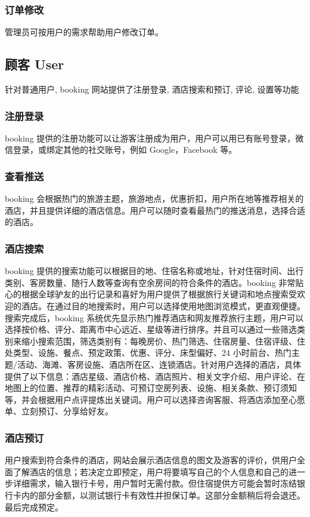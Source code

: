 \documentclass[11pt]{article}
\begin{document}
		\subsubsection{订单修改} 
		管理员可按用户的需求帮助用户修改订单。
		
	\subsection{顾客 User}
		针对普通用户, booking 网站提供了注册登录, 酒店搜索和预订, 评论, 设置等功能
		\subsubsection{注册登录}
		booking 提供的注册功能可以让游客注册成为用户，用户可以用已有账号登录，微信登录，或绑定其他的社交账号，例如 Google，Facebook 等。
		\subsubsection{查看推送}
		booking 会根据热门的旅游主题，旅游地点，优惠折扣，用户所在地等推荐相关的酒店，并且提供详细的酒店信息。用户可以随时查看最热门的推送消息，选择合适的酒店。
		\subsubsection{酒店搜索}
		booking 提供的搜索功能可以根据目的地、住宿名称或地址，针对住宿时间、出行类别、客房数量、随行人数等查询有空余房间的符合条件的酒店。booking 非常贴心的根据全球驴友的出行记录和喜好为用户提供了根据旅行关键词和地点搜索受欢迎的酒店。在通过目的地搜索时，用户可以选择使用地图浏览模式，更直观便捷。搜索完成后，booking 系统优先显示热门推荐酒店和网友推荐旅行主题，用户可以选择按价格、评分、距离市中心远近、星级等进行排序。并且可以通过一些筛选类别来缩小搜索范围，筛选类别有：每晚房价、热门筛选、住宿房量、住宿评级、住处类型、设施、餐点、预定政策、优惠、评分、床型偏好、24 小时前台、热门主题/活动、海滩、客房设施、酒店所在区、连锁酒店。针对用户选择的酒店，具体提供了以下信息：酒店星级、酒店价格、酒店照片、相关文字介绍、用户评论、在地图上的位置、推荐的精彩活动、可预订空房列表、设施、相关条款、预订须知等，并会根据用户点评提炼出关键词。用户可以选择咨询客服、将酒店添加至心愿单、立刻预订、分享给好友。
		\subsubsection{酒店预订}
			用户搜索到符合条件的酒店，网站会展示酒店信息的图文及游客的评价，供用户全面了解酒店的信息；若决定立即预定，用户将要填写自己的个人信息和自己的进一步详细需求，输入银行卡号，用户暂时无需付款。但住宿提供方可能会暂时冻结银行卡内的部分金额，以测试银行卡有效性并担保订单。这部分金额稍后将会退还。最后完成预定。
		
\end{document}
